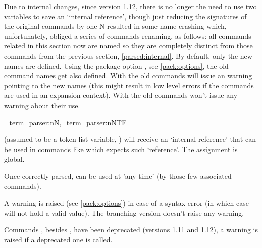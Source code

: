 \documentclass[10pt]{article}
\begin{document}
Due to internal changes, since version 1.12, there is no longer the need to use two variables to save an `internal reference', though just reducing the signatures of the original  commands by one N resulted in some name crashing which, unfortunately,  obliged a series of commands renaming, as follows: all commands related in this section now are named  so they are completely distinct from those commands from the previous section, \ref{parsed:internal}. By default, only the new names are defined. Using the package option , see \ref{pack:options}, the old command names get also defined. With  the old commands will issue an warning pointing to the new names (this might result in low level errors if the commands are used in an expansion context). With  the old commands won't issue any warning about their use.

\begin{codedescribe}[code,new=2023/11/28,update=2025/10/25,update=2025/12/08]{\starray_term_parser:nN,\starray_term_parser:nNTF}
\begin{codesyntax}%
\end{codesyntax}
 (assumed to be a token list variable, ) will receive an `internal reference' that can be used in commands like  which expects such `reference'. The assignment is global.
\end{codedescribe}
\begin{tsremark}
Once correctly parsed,  can be used at 'any time' (by those few  associated commands).\end{tsremark}
\begin{tsremark}
A warning is raised (see \ref{pack:options}) in case of a  syntax error (in which case  will not hold a valid value). The branching version doesn't raise any warning.
\end{tsremark}
\begin{tsremark}
 Commands , besides , have been deprecated (versions 1.11 and 1.12), a warning is raised if a deprecated one is called.
\end{tsremark}
\end{document}
